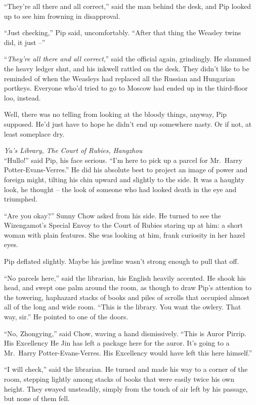``They're all there and all correct,'' said the man behind the desk, and
Pip looked up to see him frowning in disapproval.

``Just checking,'' Pip said, uncomfortably. ``After that thing the
Weasley twins did, it just --''

``\emph{They're all there and all correct},'' said the official again,
grindingly. He slammed the heavy ledger shut, and his inkwell rattled on
the desk. They didn't like to be reminded of when the Weasleys had
replaced all the Russian and Hungarian portkeys. Everyone who'd tried to
go to Moscow had ended up in the third-floor loo, instead.

Well, there was no telling from looking at the bloody things, anyway,
Pip supposed. He'd just have to hope he didn't end up somewhere nasty.
Or if not, at least someplace dry.

\mybreak

\emph{Yu's Library, The Court of Rubies, Hangzhou}\\

``Hullo!'' said Pip, his face serious. ``I'm here to pick up a parcel
for Mr.~Harry Potter-Evans-Verres.'' He did his absolute best to project
an image of power and foreign might, tilting his chin upward and
slightly to the side. It was a haughty look, he thought -- the look of
someone who had looked death in the eye and triumphed.

``Are you okay?'' Sunny Chow asked from his side. He turned to see the
Wizengamot's Special Envoy to the Court of Rubies staring up at him: a
short woman with plain features. She was looking at him, frank curiosity
in her hazel eyes.

Pip deflated slightly. Maybe his jawline wasn't strong enough to pull
that off.

``No parcels here,'' said the librarian, his English heavily accented.
He shook his head, and swept one palm around the room, as though to draw
Pip's attention to the towering, haphazard stacks of books and piles of
scrolls that occupied almost all of the long and wide room. ``This is
the library. You want the owlery. That way, sir.'' He pointed to one of
the doors.

``No, Zhongying,'' said Chow, waving a hand dismissively. ``This is
Auror Pirrip. His Excellency He Jin has left a package here for the
auror. It's going to a Mr.~Harry Potter-Evans-Verres. His Excellency
would have left this here himself.''

``I will check,'' said the librarian. He turned and made his way to a
corner of the room, stepping lightly among stacks of books that were
easily twice his own height. They swayed unsteadily, simply from the
touch of air left by his passage, but none of them fell.

